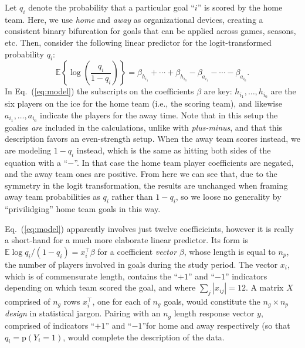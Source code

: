 Let $q_i$ denote the probability that a particular goal ``$i$'' is scored by
the home team.  Here, we use {\em home} and {\em away} as organizational devices,
creating a consistent binary bifurcation for goals that can be applied across games,
seasons, etc.  Then, consider the following linear predictor
for the logit-transformed probability $q_i$:
\begin{equation}
\mathbb{E}\left\{\log \left(\frac{q_i}{1-q_i} \right)\right\} 
= \beta_{h_{i_1}} + \cdots + \beta_{h_{i_6}} - 
\beta_{a_{i_1}} - \cdots - \beta_{a_{i_6}}.
\label{eq:model}
\end{equation}
In Eq.~(\ref{eq:model}) the subscripts on the coefficients $\beta$ are
key: $h_{i_1}, \dots, h_{i_6}$ are the six players on the ice for the home
team (i.e., the scoring team), and likewise $a_{i_1}, \dots, a_{i_6}$ indicate
the players for the away time.  Note that in this setup the goalies {\em are}
included in the calculations, unlike with {\em plus-minus}, and that this
description favors an even-strength setup.  When the away team scores instead,
we are modeling $1-q_i$ instead, which is the same as hitting both sides of
the equation with a ``$-$''.  In that case the home team player coefficients
are negated, and the away team ones are positive.  From here we can see that,
due to the symmetry in the logit transformation, the results are unchanged
when framing away team probabilities as $q_i$ rather than $1-q_i$, so we loose
no generality by ``privilidging'' home team goals in this way.

Eq.~(\ref{eq:model}) apparently involves just twelve
coefficieints, however it is really a short-hand for a much more elaborate
linear predictor. Its form is $\mathbb{E} \log q_i/(1-q_i) = x_i^\top \beta$ for a
coefficient {\em vector} $\beta$, whose length is equal to $n_p$, the number
of players involved in goals during the study period.  The vector $x_i$, which
is of commensurate length, contains the ``$+1$'' and ``$-1$'' indicators
depending on which team scored the goal, and where $\sum_j |x_{ij}| = 12$.  A
matrix $X$ comprised of $n_g$ rows $x_i^\top$, one for each of $n_g$ goals,
would constitute the $n_g \times n_p$ {\em design} in statistical jargon.
Pairing with an $n_g$ length response vector $y$, comprised of indicators
``$+1$'' and ``$-1$''for home and away respectively (so that $q_i =
\mathrm{p}(Y_i = 1)$,
would complete the description of the data.

